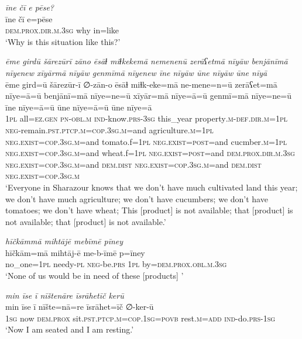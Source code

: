 \ea \label{PM.32}
\textit{īne čī e pēse?} \\ 
\gll īne čī e=pēse \\ 
 \textsc{dem.prox}\textsc{.dir}\textsc{.m}\textsc{.3sg} why in=like \\ 
\glt `Why is this situation like this?'
\z 
 
\ea \label{PM.37}
\textit{ēme girdū šārezūrī zāno ēsāɫ miɫkekemā nemenenū zerāʕetmā nīyāw benjānīmā nīyenew xīyārmā nīyāw genmīmā nīyenew īne nīyāw ūne nīyāw ūne nīyā} \\ 
\gll ēme gird=ū šārezūr-ī ∅-zān-o ēsāɫ miɫk-eke=mā ne-mene=n=ū zerāʕet=mā nīye=ā=ū benjānī=mā nīye=ne=ū xīyār=mā nīye=ā=ū genmī=mā nīye=ne=ū īne nīye=ā=ū ūne nīye=ā=ū ūne nīye=ā \\ 
 \textsc{1pl} all\textsc{\textsc{=ez.gen}} \textsc{pn}\textsc{-obl}\textsc{.m} \textsc{ind-}know\textsc{.prs}\textsc{-3sg} this\_year property\textsc{.m}\textsc{-def}\textsc{.dir}\textsc{.m}\textsc{=1pl} \textsc{neg-}remain\textsc{.pst}\textsc{.ptcp}\textsc{.m}\textsc{=cop}\textsc{.3sg}\textsc{.m}=and agriculture\textsc{.m}\textsc{=1pl} \textsc{\textsc{neg.}exist}\textsc{=cop}\textsc{.3sg}\textsc{.m}=and tomato.f\textsc{=1pl} \textsc{\textsc{neg.}exist}\textsc{=\textsc{post}}=and cucmber\textsc{.m}\textsc{=1pl} \textsc{\textsc{neg.}exist}\textsc{=cop}\textsc{.3sg}\textsc{.m}=and wheat.f\textsc{=1pl} \textsc{\textsc{neg.}exist}\textsc{=\textsc{post}}=and \textsc{dem.prox}\textsc{.dir}\textsc{.m}\textsc{.3sg} \textsc{\textsc{neg.}exist}\textsc{=cop}\textsc{.3sg}\textsc{.m}=and \textsc{dem.dist} \textsc{\textsc{neg.}exist}\textsc{=cop}\textsc{.3sg}\textsc{.m}=and \textsc{dem.dist} \textsc{\textsc{neg.}exist}\textsc{=cop}\textsc{.3sg}\textsc{.m} \\ 
\glt `Everyone in Sharazour knows that we don’t have much cultivated land this year; we don’t have much agriculture; we don’t have cucumbers; we don’t have tomatoes; we don’t have wheat; This [product] is not available; that [product] is not available; that [product] is not available.'
\z 
 
\ea \label{PM.39}
\textit{hīčkāmmā mihtājē mebīmē pīney} \\ 
\gll hīčkām=mā mihtāj-ē me-b-īmē p=īney \\ 
 no\_one\textsc{=1pl} needy\textsc{\textsc{-pl}} \textsc{neg-}be\textsc{.prs} \textsc{1pl} by=\textsc{dem.prox}\textsc{.obl}\textsc{.m}\textsc{.3sg} \\ 
\glt `None of us would be in need of these [products] '
\z 
 
\ea \label{PM.45}
\textit{min īse ī nīštenāre īsrāhetīč kerū} \\ 
\gll min īse ī nīšte=nā=re īsrāhet=īč ∅-ker-ū \\ 
 \textsc{1sg} now \textsc{dem.prox} sit\textsc{.pst}\textsc{.ptcp}\textsc{.m}\textsc{=cop}\textsc{.\textsc{1sg}}\textsc{=\textsc{povb}} rest\textsc{.m}\textsc{=add} \textsc{ind-}do\textsc{.prs}\textsc{-\textsc{1sg}} \\ 
\glt `Now I am seated and I am resting.'
\z 
 
